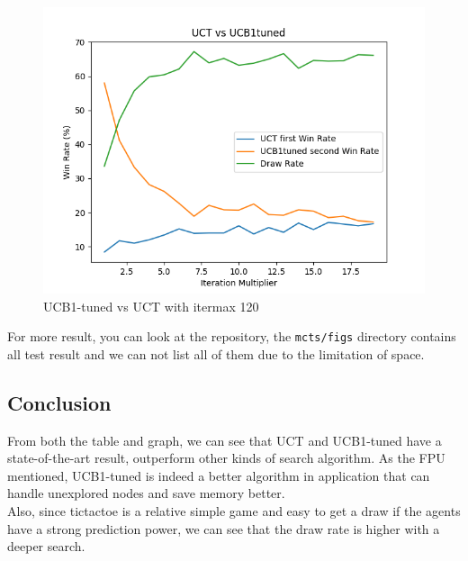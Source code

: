 \documentclass[11pt]{article}
\theoremstyle{definitionstyle}
\begin{document}
\begin{figure}[H]
\begin{minipage}{0.32\textwidth}
        \includegraphics[width=\textwidth]{mcts/figs/120/UCT vs UCB1tuned1.png}
        \caption{UCB1-tuned vs UCT with itermax 120}
        \label{fig:1202}
    \end{minipage}
\end{figure}
For more result, you can look at the repository, the \texttt{mcts/figs} directory contains all test result and we can not list all of them due to the limitation of space.
\subsection{Conclusion}
From both the table and graph, we can see that UCT and UCB1-tuned have a state-of-the-art result, outperform other kinds of search algorithm. As the FPU mentioned, UCB1-tuned is indeed a better algorithm in application that can handle unexplored nodes and save memory better.\\
Also, since tictactoe is a relative simple game and easy to get a draw if the agents have a strong prediction power, we can see that the draw rate is higher with a deeper search.
\end{document}
